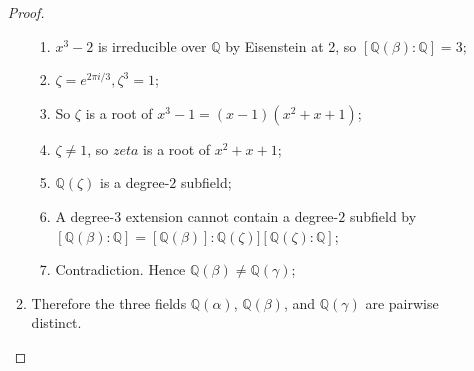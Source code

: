 \documentclass[12pt]{article}
\newcommand{\Q}{\mathbb{Q}}
\begin{document}
\begin{enumerate}
\begin{proof}
\begin{enumerate}
\begin{enumerate}
                \item $x^3-2$ is irreducible over $\Q$ by Eisenstein at 2, so $[\Q(\beta):\Q]=3$;
                \item $\zeta =e^{2\pi i/3},\zeta^3=1$;
                \item So $\zeta$ is a root of $x^3-1=(x-1)(x^2+x+1)$;
                \item $\zeta \ne1$, so $zeta$ is a root of $x^2+x+1$;
                \item $\Q(\zeta)$ is a degree-$2$ subfield;
                \item A degree-$3$ extension cannot contain a degree-$2$ subfield by $[\Q(\beta):\Q]=[\Q(\beta)]:\Q(\zeta)][\Q(\zeta):\Q]$;
                \item Contradiction. Hence $\Q(\beta)\neq\Q(\gamma)$;
            \end{enumerate}
            \item Therefore the three fields $\Q(\alpha)$, $\Q(\beta)$, and $\Q(\gamma)$ are pairwise distinct.
        \end{enumerate}
    \end{proof}
\end{enumerate}

\newpage
\end{document}
